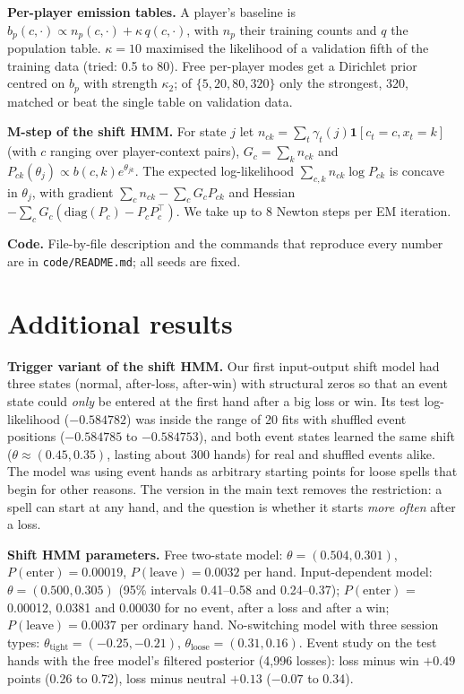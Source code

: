 \documentclass{article}
\begin{document}
\textbf{Per-player emission tables.} A player's baseline is $b_p(c,\cdot)\propto n_p(c,\cdot)+\kappa\,q(c,\cdot)$, with $n_p$ their training counts and $q$ the population table. $\kappa=10$ maximised the likelihood of a validation fifth of the training data (tried: 0.5 to 80). Free per-player modes get a Dirichlet prior centred on $b_p$ with strength $\kappa_2$; of $\{5,20,80,320\}$ only the strongest, 320, matched or beat the single table on validation data.

\textbf{M-step of the shift HMM.} For state $j$ let $n_{ck}=\sum_t\gamma_t(j)\mathbf 1[c_t=c,x_t=k]$ (with $c$ ranging over player-context pairs), $G_c=\sum_kn_{ck}$ and $P_{ck}(\theta_j)\propto b(c,k)e^{\theta_{jk}}$. The expected log-likelihood $\sum_{c,k}n_{ck}\log P_{ck}$ is concave in $\theta_j$, with gradient $\sum_cn_{ck}-\sum_cG_cP_{ck}$ and Hessian $-\sum_cG_c(\mathrm{diag}(P_c)-P_cP_c^\top)$. We take up to 8 Newton steps per EM iteration.

\textbf{Code.} File-by-file description and the commands that reproduce every number are in \texttt{code/README.md}; all seeds are fixed.

\section{Additional results}
\label{app:more}
\textbf{Trigger variant of the shift HMM.} Our first input-output shift model had three states (normal, after-loss, after-win) with structural zeros so that an event state could \emph{only} be entered at the first hand after a big loss or win. Its test log-likelihood ($-0.584782$) was inside the range of 20 fits with shuffled event positions ($-0.584785$ to $-0.584753$), and both event states learned the same shift ($\theta\approx(0.45,0.35)$, lasting about 300 hands) for real and shuffled events alike. The model was using event hands as arbitrary starting points for loose spells that begin for other reasons. The version in the main text removes the restriction: a spell can start at any hand, and the question is whether it starts \emph{more often} after a loss.

\textbf{Shift HMM parameters.} Free two-state model: $\theta=(0.504,0.301)$, $P(\text{enter})=0.00019$, $P(\text{leave})=0.0032$ per hand. Input-dependent model: $\theta=(0.500,0.305)$ (95\% intervals 0.41--0.58 and 0.24--0.37); $P(\text{enter})$ = 0.00012, 0.0381 and 0.00030 for no event, after a loss and after a win; $P(\text{leave})=0.0037$ per ordinary hand. No-switching model with three session types: $\theta_{\text{tight}}=(-0.25,-0.21)$, $\theta_{\text{loose}}=(0.31,0.16)$. Event study on the test hands with the free model's filtered posterior (4{,}996 losses): loss minus win $+0.49$ points (0.26 to 0.72), loss minus neutral $+0.13$ ($-0.07$ to 0.34).
\end{document}
